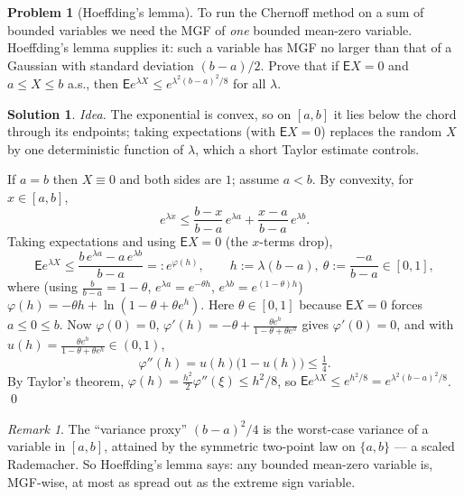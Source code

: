 \documentclass[14pt]{extarticle}
\theoremstyle{definition}
\newtheorem{exercise}{Problem}
\newtheorem*{solution}{Solution}
\theoremstyle{remark}
\newtheorem*{remark}{Remark}
\newcommand\expc{\mathsf{E}}
\begin{document}
\begin{exercise}[Hoeffding's lemma]\label{prob:hlem}
To run the Chernoff method on a sum of bounded variables we need the MGF of \emph{one} bounded mean-zero variable. Hoeffding's lemma supplies it: such a variable has MGF no larger than that of a Gaussian with standard deviation $(b-a)/2$. Prove that if $\expc X=0$ and $a\le X\le b$ a.s., then $\expc e^{\lambda X}\le e^{\lambda^2(b-a)^2/8}$ for all $\lambda$.
\end{exercise}
\begin{solution}
\emph{Idea.} The exponential is convex, so on $[a,b]$ it lies below the chord through its endpoints; taking expectations (with $\expc X=0$) replaces the random $X$ by one deterministic function of $\lambda$, which a short Taylor estimate controls.

If $a=b$ then $X\equiv0$ and both sides are $1$; assume $a<b$. By convexity, for $x\in[a,b]$,
\[
e^{\lambda x}\le\frac{b-x}{b-a}\,e^{\lambda a}+\frac{x-a}{b-a}\,e^{\lambda b}.
\]
Taking expectations and using $\expc X=0$ (the $x$-terms drop),
\[
\expc e^{\lambda X}\le\frac{b\,e^{\lambda a}-a\,e^{\lambda b}}{b-a}=:e^{\varphi(h)},\qquad h:=\lambda(b-a),\ \theta:=\frac{-a}{b-a}\in[0,1],
\]
where (using $\tfrac{b}{b-a}=1-\theta$, $e^{\lambda a}=e^{-\theta h}$, $e^{\lambda b}=e^{(1-\theta)h}$) $\varphi(h)=-\theta h+\ln(1-\theta+\theta e^{h})$. Here $\theta\in[0,1]$ because $\expc X=0$ forces $a\le0\le b$. Now $\varphi(0)=0$, $\varphi'(h)=-\theta+\tfrac{\theta e^h}{1-\theta+\theta e^h}$ gives $\varphi'(0)=0$, and with $u(h)=\tfrac{\theta e^h}{1-\theta+\theta e^h}\in(0,1)$,
\[
\varphi''(h)=u(h)\bigl(1-u(h)\bigr)\le\tfrac14.
\]
By Taylor's theorem, $\varphi(h)=\tfrac{h^2}2\varphi''(\xi)\le h^2/8$, so $\expc e^{\lambda X}\le e^{h^2/8}=e^{\lambda^2(b-a)^2/8}$. \qed
\end{solution}
\begin{remark}
The ``variance proxy'' $(b-a)^2/4$ is the worst-case variance of a variable in $[a,b]$, attained by the symmetric two-point law on $\{a,b\}$ --- a scaled Rademacher. So Hoeffding's lemma says: any bounded mean-zero variable is, MGF-wise, at most as spread out as the extreme sign variable.
\end{remark}
\end{document}
